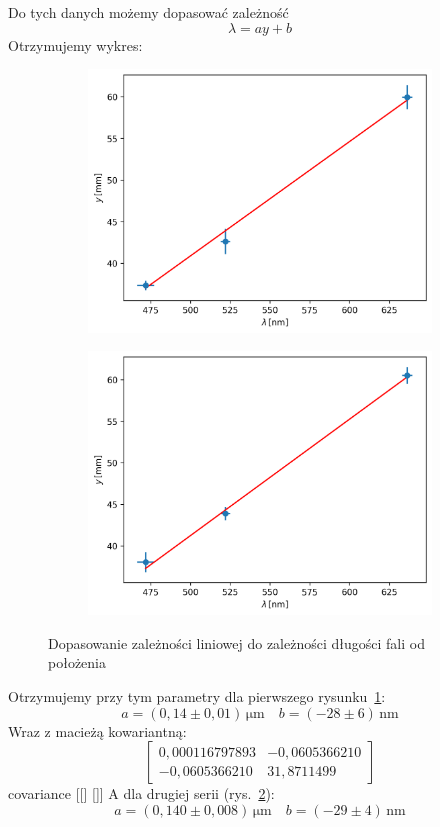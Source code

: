 \documentclass[12pt]{article}
\begin{document}
Do tych danych możemy dopasować zależność
\[
    \lambda = ay + b
\]
Otrzymujemy wykres:
\begin{figure}[H]
	\centering
	\begin{subfigure}{0.45\textwidth}
		\centering
		\includegraphics[width=\linewidth]{line_fit_0}
        \label{fig:line_fit_1}
	\end{subfigure}
	\hfill
	\begin{subfigure}{0.45\textwidth}
		\centering
		\includegraphics[width=\linewidth]{line_fit_1}
        \label{fig:line_fit_2}
    \end{subfigure}
    \caption{Dopasowanie zależności liniowej do zależności długości fali od położenia}
    \label{fig:line_fit}
\end{figure}
Otrzymujemy przy tym parametry dla pierwszego rysunku~\ref{fig:line_fit_1}:
\[
    a = (0{,}14 \pm 0{,}01) \, \mathrm{\mu m} \quad b = (-28 \pm 6) \, \mathrm{nm}
\]
Wraz z macieżą kowariantną:
\[
    \begin{bmatrix}
        0{,}000116797893 & -0{,}0605366210 \\
        -0{,}0605366210&  31{,}8711499
    \end{bmatrix}
\]
covariance [[]
 []]
A dla drugiej serii (rys.~\ref{fig:line_fit_2}):
\[
    a = (0{,}140 \pm 0{,}008) \, \mathrm{\mu m} \quad b = (-29 \pm 4) \, \mathrm{nm}
\]
\end{document}

